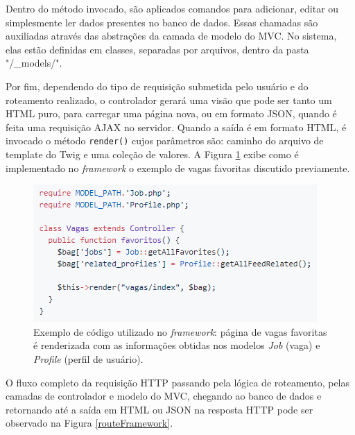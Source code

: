 Dentro do método invocado, são aplicados comandos para adicionar, editar ou simplesmente ler dados presentes no banco de dados. Essas chamadas são auxiliadas através das abstrações da camada de modelo do MVC. No sistema, elas estão definidas em classes, separadas por arquivos, dentro da pasta "/\_models/".

Por fim, dependendo do tipo de requisição submetida pelo usuário e do roteamento realizado, o controlador gerará uma visão que pode ser tanto um HTML puro, para carregar uma página nova, ou em formato JSON, quando é feita uma requisição AJAX no servidor. Quando a saída é em formato HTML, é invocado o método \verb|render()| cujos parâmetros são: caminho do arquivo de template do Twig e uma coleção de valores. A Figura \ref{codeFramework} exibe como é implementado no \textit{framework} o exemplo de vagas favoritas discutido previamente.

\begin{figure}[h]
    \caption{Exemplo de código utilizado no \textit{framework}: página de vagas favoritas é renderizada com as informações obtidas nos modelos \textit{Job} (vaga) e \textit{Profile} (perfil de usuário). }
       	\begin{center}
            \includegraphics[width=.75\textwidth]{figuras/code-1.png}
        \end{center}
    \label{codeFramework}
\end{figure}

O fluxo completo da requisição HTTP passando pela lógica de roteamento, pelas camadas de controlador e modelo do MVC, chegando ao banco de dados e retornando até a saída em HTML ou JSON na resposta HTTP pode ser observado na Figura \ref{routeFramework}.


